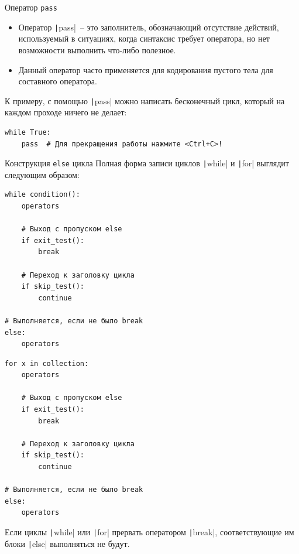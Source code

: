 \documentclass[aspectratio=169]{beamer}	%
\begin{document}
\begin{frame}[fragile]{Оператор \texttt{pass}}
\scriptsize
\begin{itemize}
	\item Оператор \texttt|pass|~-- это заполнитель, обозначающий отсутствие действий, используемый в ситуациях, когда синтаксис требует оператора, но нет возможности выполнить что-либо полезное.
		
	\item Данный оператор часто применяется для кодирования пустого тела для составного оператора.
\end{itemize}

К примеру, с помощью \texttt|pass| можно написать бесконечный цикл, который на каждом проходе ничего не делает:

\begin{verbatim}
while True:
    pass  # Для прекращения работы нажмите <Ctrl+C>!
\end{verbatim}
\vfill
\end{frame}


\begin{frame}[fragile]{Конструкция \texttt{else} цикла}
\scriptsize
Полная форма записи циклов \texttt|while| и \texttt|for| выглядит следующим образом:

\begin{multicols}{2}

\begin{verbatim}
while condition():
    operators

    # Выход с пропуском else
    if exit_test():
        break 

    # Переход к заголовку цикла
    if skip_test():
        continue

# Выполняется, если не было break
else:
    operators
\end{verbatim}

\columnbreak

\begin{verbatim}
for x in collection:
    operators

    # Выход с пропуском else
    if exit_test():
        break 

    # Переход к заголовку цикла
    if skip_test():
        continue

# Выполняется, если не было break
else:
    operators
\end{verbatim}

\end{multicols}	

Если циклы \texttt|while| или \texttt|for| прервать оператором \texttt|break|, соответствующие им блоки \texttt|else| выполняться не будут.
\vfill
\end{frame}
\end{document}
